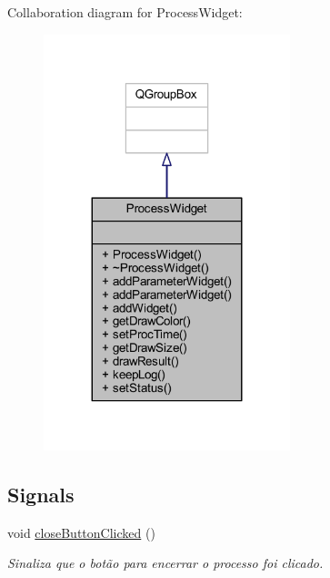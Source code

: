 Collaboration diagram for Process\+Widget\+:
\nopagebreak
\begin{figure}[H]
\begin{center}
\leavevmode
\includegraphics[width=203pt]{class_process_widget__coll__graph}
\end{center}
\end{figure}
\subsection*{Signals}
\begin{DoxyCompactItemize}
\item 
\hypertarget{class_process_widget_a10e1c99ae3f62bbba072bfc96d9d857c}{}void \hyperlink{class_process_widget_a10e1c99ae3f62bbba072bfc96d9d857c}{close\+Button\+Clicked} ()\label{class_process_widget_a10e1c99ae3f62bbba072bfc96d9d857c}

\begin{DoxyCompactList}\small\item\em Sinaliza que o botão para encerrar o processo foi clicado. \end{DoxyCompactList}\end{DoxyCompactItemize}
